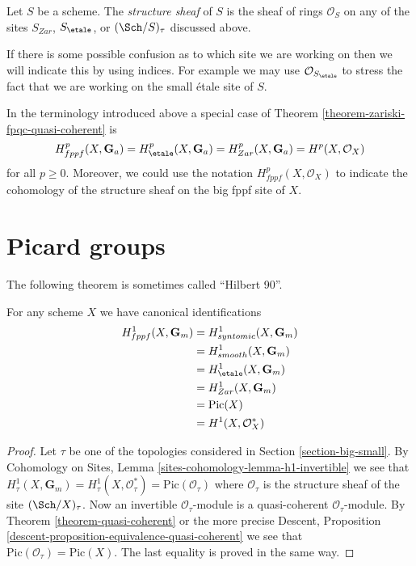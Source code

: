 \begin{definition}
\label{definition-structure-sheaf}
Let $S$ be a scheme. The {\it structure sheaf} of $S$ is the sheaf of rings
$\mathcal{O}_S$
on any of the sites $S_{Zar}$, $S_\etale$, or $(\Sch/S)_\tau$
discussed above.
\end{definition}

\noindent
If there is some possible confusion as to which site we are working on
then we will indicate this by using indices. For example we may use
$\mathcal{O}_{S_\etale}$ to stress the fact that we are working on the
small \'etale site of $S$.

\begin{remark}
\label{remark-special-case-fpqc-cohomology-quasi-coherent}
In the terminology introduced above a special case of
Theorem \ref{theorem-zariski-fpqc-quasi-coherent}
is
$$
H_{fppf}^p(X, \mathbf{G}_a) =
H_\etale^p(X, \mathbf{G}_a) =
H_{Zar}^p(X, \mathbf{G}_a) =
H^p(X, \mathcal{O}_X)
$$
for all $p \geq 0$. Moreover, we could use the notation
$H^p_{fppf}(X, \mathcal{O}_X)$ to indicate the cohomology of the
structure sheaf on the big fppf site of $X$.
\end{remark}




\section{Picard groups}
\label{section-picard-groups}

\noindent
The following theorem is sometimes called ``Hilbert 90''.

\begin{theorem}
\label{theorem-picard-group}
For any scheme $X$ we have canonical identifications
\begin{align*}
H_{fppf}^1(X, \mathbf{G}_m) & = H^1_{syntomic}(X, \mathbf{G}_m) \\
& = H^1_{smooth}(X, \mathbf{G}_m) \\
& = H_\etale^1(X, \mathbf{G}_m) \\
& = H^1_{Zar}(X, \mathbf{G}_m) \\
& = \text{Pic}(X) \\
& = H^1(X, \mathcal{O}_X^*)
\end{align*}
\end{theorem}

\begin{proof}
Let $\tau$ be one of the topologies considered in
Section \ref{section-big-small}.
By
Cohomology on Sites, Lemma
\ref{sites-cohomology-lemma-h1-invertible}
we see that
$H^1_\tau(X, \mathbf{G}_m) =
H^1_\tau(X, \mathcal{O}_\tau^*) =
\text{Pic}(\mathcal{O}_\tau)$
where $\mathcal{O}_\tau$ is the structure sheaf of the site
$(\Sch/X)_\tau$. Now an invertible $\mathcal{O}_\tau$-module
is a quasi-coherent $\mathcal{O}_\tau$-module.
By Theorem \ref{theorem-quasi-coherent} or the more precise
Descent, Proposition \ref{descent-proposition-equivalence-quasi-coherent}
we see that $\text{Pic}(\mathcal{O}_\tau) = \text{Pic}(X)$.
The last equality is proved in the same way.
\end{proof}






